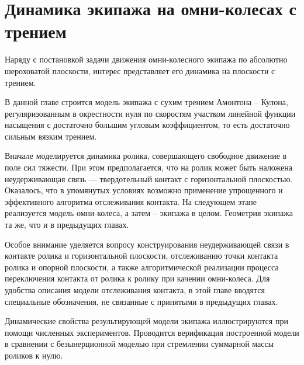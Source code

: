 \chapter{Динамика экипажа на омни-колесах с трением}

Наряду с постановкой задачи движения омни-колесного экипажа по абсолютно шероховатой плоскости, интерес представляет его динамика на плоскости с трением.

В данной главе строится модель экипажа с сухим трением Амонтона -- Кулона, регуляризованным в окрестности нуля по скоростям участком линейной функции насыщения с достаточно большим угловым коэффициентом, то есть достаточно сильным вязким трением.

Вначале моделируется динамика ролика, совершающего свободное движение в поле сил тяжести.
При этом предполагается, что на ролик может быть наложена неудерживающая связь --- твердотельный контакт с горизонтальной плоскостью. 
Оказалось, что в упомянутых условиях возможно применение упрощенного и эффективного алгоритма отслеживания контакта.
На следующем этапе реализуется модель омни-колеса, а затем -- экипажа в целом.
Геометрия экипажа та же, что и в предыдущих главах.

Особое внимание уделяется вопросу конструирования неудерживающей связи в контакте ролика и горизонтальной плоскости,
отслеживанию точки контакта ролика и опорной плоскости,
а также алгоритмической реализации процесса 
переключения контакта от ролика к ролику при качении омни-колеса.
Для удобства описания модели отслеживания контакта, в этой главе вводятся специальные обозначения, не связанные с принятыми в предыдущих главах.

Динамические свойства результирующей модели экипажа иллюстрируются при помощи численных экспериментов.
Проводится верификация построенной модели в сравнении с безынерционной моделью при стремлении суммарной массы роликов к нулю.

